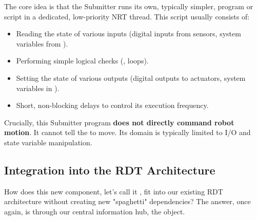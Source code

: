 The core idea is that the Submitter runs its own, typically simpler, program or script in a dedicated, low-priority NRT thread. This script usually consists of:
\begin{itemize}
    \item Reading the state of various inputs (digital inputs from sensors, system variables from ).
    \item Performing simple logical checks (, loops).
    \item Setting the state of various outputs (digital outputs to actuators, system variables in ).
    \item Short, non-blocking delays to control its execution frequency.
\end{itemize}
Crucially, this Submitter program \textbf{does not directly command robot motion}. It cannot tell the  to move. Its domain is typically limited to I/O and state variable manipulation.

\subsection{Integration into the RDT Architecture}
\label{subsec:submitter_integration}

How does this new component, let's call it , fit into our existing RDT architecture without creating new "spaghetti" dependencies? The answer, once again, is through our central information hub, the  object.


